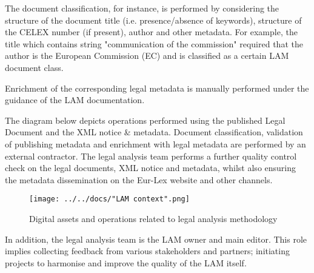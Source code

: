 The document classification, for instance, is performed by considering the structure of the document title (i.e. presence/absence of keywords), structure of the CELEX number (if present), author and other metadata. For example, the title which contains string "communication of the commission" required that the author is the European Commission (EC) and is classified as a certain LAM document class.

Enrichment of the corresponding legal metadata is manually performed under the guidance of the LAM documentation.

The diagram below depicts operations performed using the published Legal Document and the XML notice \& metadata. Document classification, validation of publishing metadata and enrichment with legal metadata are performed by an external contractor. The legal analysis team performs a further quality control check on the legal documents, XML notice and metadata, whilst also ensuring the  metadata dissemination on the Eur-Lex website and other channels.

\begin{figure}[!ht]
\centering
\texttt{[image: ../../docs/"LAM context".png]}
\caption{Digital assets and operations related to legal
analysis methodology}
\end{figure}

In addition, the legal analysis team is the LAM owner and main editor.
This role implies collecting feedback from various stakeholders and
partners; initiating projects to harmonise and improve the quality of the
LAM itself.
